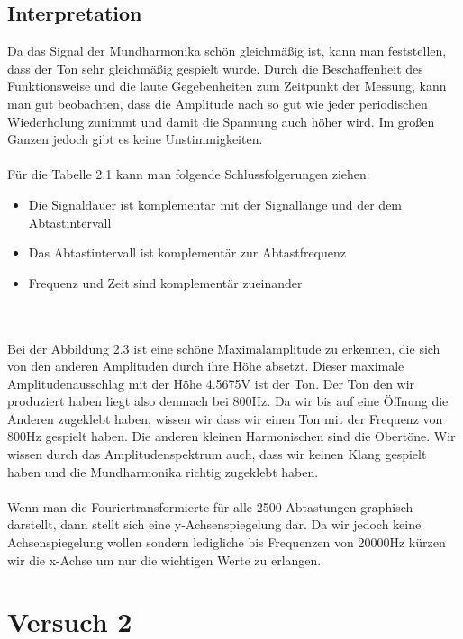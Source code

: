 \documentclass[12pt, oneside, a4paper, \docLanguage]{report}
\begin{document}
\section{Interpretation}
\label{chap:VERSUCH_1_INTERPRETATION}
Da das Signal der Mundharmonika schön gleichmäßig ist, kann man feststellen, dass der Ton sehr gleichmäßig gespielt wurde. 
\newline 
Durch die Beschaffenheit des Funktionsweise und die laute Gegebenheiten zum Zeitpunkt der Messung, kann man gut beobachten, dass die Amplitude nach so gut wie jeder periodischen Wiederholung zunimmt und damit die Spannung auch höher wird.
Im großen Ganzen jedoch gibt es keine Unstimmigkeiten.
\\~\\
Für die Tabelle 2.1 kann man folgende Schlussfolgerungen ziehen: ~\par
\begin{itemize}
	\item Die Signaldauer ist komplementär mit der Signallänge und der dem Abtastintervall
	\item Das Abtastintervall ist komplementär zur Abtastfrequenz
	\item Frequenz und Zeit sind komplementär zueinander
\end{itemize}
\\~\\
Bei der Abbildung 2.3 ist eine schöne Maximalamplitude zu erkennen, die sich von den anderen Amplituden durch ihre Höhe absetzt.
Dieser maximale Amplitudenausschlag mit der Höhe 4.5675V ist der Ton.
\newline 
Der Ton den wir produziert haben liegt also demnach bei 800Hz. Da wir bis auf eine Öffnung die Anderen zugeklebt haben, wissen wir dass wir einen Ton mit der Frequenz von 800Hz gespielt haben. 
\newline
Die anderen kleinen Harmonischen sind die Obertöne.
Wir wissen durch das Amplitudenspektrum auch, dass wir keinen Klang gespielt haben und die Mundharmonika richtig zugeklebt haben.
\\~\\
Wenn man die Fouriertransformierte für alle 2500 Abtastungen graphisch darstellt, dann stellt sich eine y-Achsenspiegelung dar.
Da wir jedoch keine Achsenspiegelung wollen sondern ledigliche bis Frequenzen von 20000Hz kürzen wir die x-Achse um nur die wichtigen Werte zu erlangen.
%
%
\chapter{Versuch 2}
\label{chap:VERSUCH_2}
\end{document}
